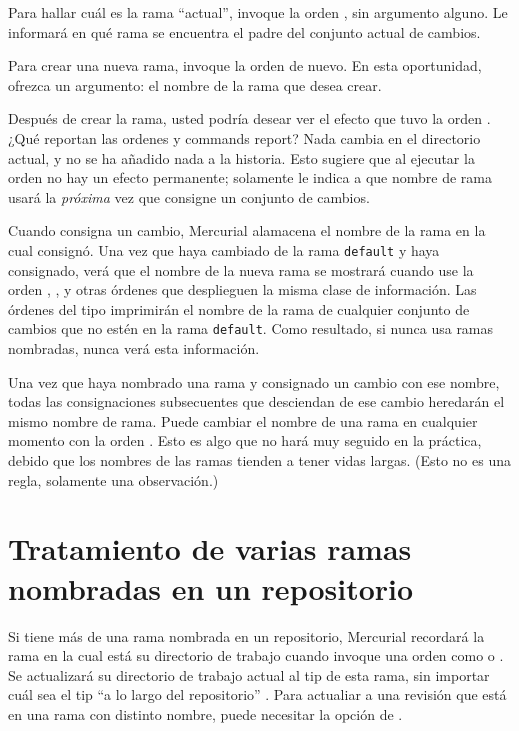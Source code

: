 Para hallar cuál es la rama ``actual'', invoque la orden
, sin argumento alguno. Le informará en qué rama se
encuentra el padre del conjunto actual de cambios.

Para crear una nueva rama, invoque la orden  de
nuevo. En esta oportunidad, ofrezca un argumento: el nombre de la rama
que desea crear.

Después de crear la rama, usted podría desear ver el efecto que tuvo
la orden .  ¿Qué reportan las ordenes  y
 commands report?
Nada cambia en el directorio actual, y no se ha añadido nada a la
historia. Esto sugiere que al ejecutar la orden  no hay
un efecto permanente; solamente le indica a que nombre de rama usará
la \emph{próxima} vez que consigne un conjunto de cambios.

Cuando consigna un cambio, Mercurial alamacena el nombre de la rama en
la cual consignó.  Una vez que haya cambiado de la rama \texttt{default}
y haya consignado, verá que el nombre de la nueva rama se mostrará
cuando use la orden , , y otras órdenes que
desplieguen la misma clase de información.
Las órdenes del tipo  imprimirán el nombre de la rama de
cualquier conjunto de cambios que no estén en la rama
\texttt{default}. Como resultado, si nunca usa ramas nombradas, nunca
verá esta información.

Una vez que haya nombrado una rama y consignado un cambio con ese
nombre, todas las consignaciones subsecuentes que desciendan de ese
cambio heredarán el mismo nombre de rama. Puede cambiar el nombre de
una rama en cualquier momento con la orden .  
Esto es algo que no hará muy seguido en la práctica, debido que los
nombres de las ramas tienden a tener vidas largas.  (Esto no es una
regla, solamente una observación.)

\section{Tratamiento de varias ramas nombradas en un repositorio}

Si tiene más de una rama nombrada en un repositorio, Mercurial
recordará la rama en la cual está su directorio de trabajo cuando
invoque una orden como  o .  Se
actualizará su directorio de trabajo actual al tip de esta rama, sin
importar cuál sea el tip ``a lo largo del repositorio'' .  Para
actualiar a una revisión que está en una rama con distinto nombre,
puede necesitar la opción  de .

